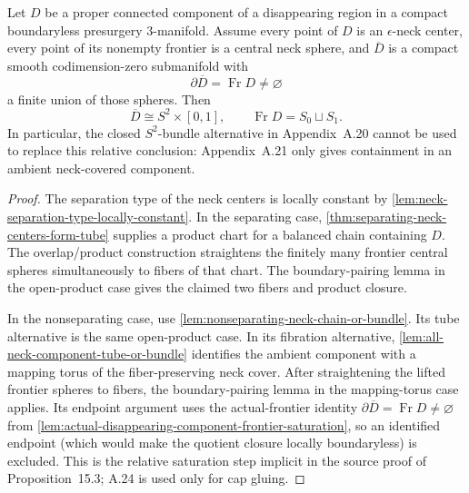 \begin{lemma}
\label{lem:proper-all-neck-relative-fibration}
\notready
Let $D$ be a proper connected component of a disappearing region in a compact
boundaryless presurgery $3$-manifold.  Assume every point of $D$ is an
$\epsilon$-neck center, every point of its nonempty frontier is a central
neck sphere, and $\overline D$ is a compact smooth codimension-zero
submanifold with
\[
 \partial\overline D=\operatorname{Fr}D\ne\varnothing
\]
a finite union of those spheres.  Then
\[
 \overline D\cong S^2\times[0,1],\qquad
 \operatorname{Fr}D=S_0\sqcup S_1.
\]
In particular, the closed $S^2$-bundle alternative in Appendix~A.20 cannot
be used to replace this relative conclusion: Appendix~A.21 only gives
containment in an ambient neck-covered component.
\end{lemma}

\begin{proof}
The separation type of the neck centers is locally constant by
\ref{lem:neck-separation-type-locally-constant}.  In the separating case,
\ref{thm:separating-neck-centers-form-tube} supplies a product chart for a
balanced chain containing $D$.  The overlap/product construction straightens
the finitely many frontier central spheres simultaneously to fibers of that
chart.  The boundary-pairing lemma in the open-product case gives the claimed
two fibers and product closure.

In the nonseparating case, use
\ref{lem:nonseparating-neck-chain-or-bundle}.  Its tube alternative is the
same open-product case.  In its fibration alternative,
\ref{lem:all-neck-component-tube-or-bundle} identifies the ambient component
with a mapping torus of the fiber-preserving neck cover.  After straightening
the lifted frontier spheres to fibers, the boundary-pairing lemma in the
mapping-torus case applies.  Its endpoint argument uses the actual-frontier
identity
\(\partial\overline D=\operatorname{Fr}D\ne\varnothing\) from
\ref{lem:actual-disappearing-component-frontier-saturation}, so an identified
endpoint (which would make the quotient closure locally boundaryless) is
excluded.  This is the relative saturation step implicit in the source proof
of Proposition~15.3; A.24 is used only for cap gluing.
\end{proof}

